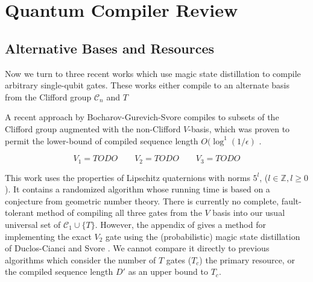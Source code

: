 \section{Quantum Compiler Review}
\label{sec:qcompile-review}

\subsection{Alternative Bases and Resources}

Now we turn to three recent works which use magic state distillation to compile
arbitrary single-qubit gates. These works either compile to an alternate
basis from the Clifford group $\mathcal{C}_n$ and $T$

A recent approach by Bocharov-Gurevich-Svore \cite{Bocharov2013}
compiles to subsets of the Clifford group augmented with the non-Clifford $V$-basis, which was proven to permit the lower-bound of compiled sequence length $O(\log^1(1/\epsilon)$
\cite{Harrow2003}.

\begin{equation}
V_1 = TODO \qquad V_2 = TODO \qquad V_3 = TODO
\end{equation}

This work uses the properties of Lipschitz quaternions with norms $5^l$, ($l \in \mathbb{Z}, l \ge 0$). It
contains a randomized algorithm whose running time is based on a conjecture from geometric number theory.
There is currently no complete, fault-tolerant method of compiling all three gates from the $V$ basis into
our usual universal set of $\mathcal{C}_1 \cup \{T\}$. However, the appendix of \cite{Bocharov2013}
gives a method for implementing the exact $V_2$ gate using the (probabilistic) magic state distillation of
Duclos-Cianci and Svore \cite{DuclosCianci2012}. 
We cannot compare it directly to previous algorithms which consider the number of $T$ gates ($T_c$)
the primary resource, or the compiled sequence length $D'$ as an upper bound to $T_c$.
